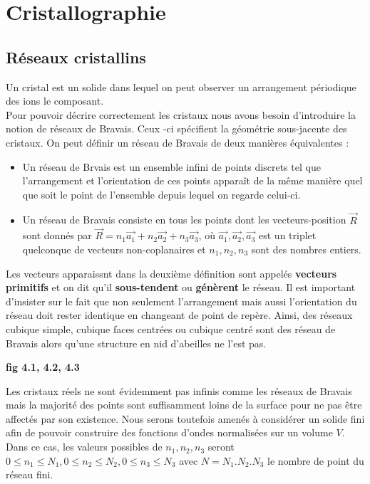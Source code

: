 \setcounter{chapter}{2}
\chapter{Cristallographie}
\section{Réseaux cristallins}

Un cristal est un solide dans lequel on peut 
observer un arrangement périodique des ions le composant.\\

Pour pouvoir décrire correctement les cristaux nous avons 
besoin d'introduire la notion de réseaux de Bravais. Ceux
-ci spécifient la géométrie sous-jacente des cristaux.
On peut définir un réseau de Bravais de deux manières équivalentes :\\

\begin{itemize}
\item Un réseau de Brvais est un ensemble infini de points discrets
 tel que l'arrangement et l'orientation de ces points apparaît de
 la même manière quel que soit le point de l'ensemble depuis lequel
 on regarde celui-ci.

\item Un réseau de Bravais consiste en tous les points dont les 
vecteurs-position $\vec{R}$ sont donnés
par $\vec{R} = n_1 \vec{a_1} + n_2 \vec{a_2} + n_3 \vec{a_3}$, où
$\vec{a_1}, \vec{a_2},\vec{a_3}$ est un triplet quelconque de
vecteurs non-coplanaires et $n_1, n_2, n_3$ sont des nombres entiers.
\end{itemize}


Les vecteurs apparaissnt dans la deuxième définition sont appelés
\textbf{vecteurs primitifs} et on dit qu'il \textbf{sous-tendent}
ou \textbf{génèrent} le réseau.
Il est important d'insister sur le fait que non seulement l'arrangement
mais aussi l'orientation du réseau doit rester identique en changeant de 
point de repère. Ainsi, des réseaux cubique simple, cubique faces centrées
ou cubique centré sont des réseau de Bravais alors qu'une structure en nid
d'abeilles ne l'est pas.

\begin{center}
\textbf{fig 4.1, 4.2, 4.3}
\end{center}

Les cristaux réels ne sont évidemment pas infinis comme les réseaux de Bravais
mais la majorité des points sont suffisamment loins de la surface pour ne pas être
affectés par son existence. Nous serons toutefois amenés à considérer un solide fini
afin de pouvoir construire des fonctions d'ondes normalisées sur un volume $V$.
Dans ce cas, les valeurs possibles de $n_1, n_2, n_3$ seront $0 \leq n_1 \leq N_1,
0 \leq n_2 \leq N_2, 0 \leq n_3 \leq N_3$ avec $N = N_1.N_2.N_3$ le nombre de point
du réseau fini.\\

